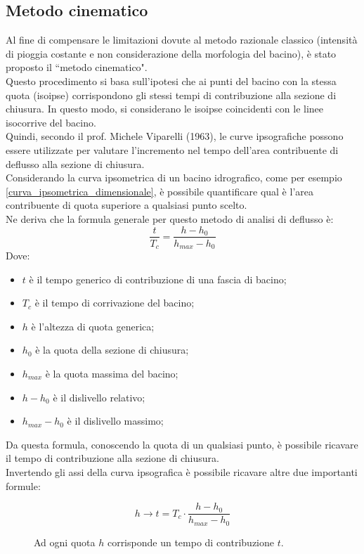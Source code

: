 \subsection{Metodo cinematico}
Al fine di compensare le limitazioni dovute al metodo razionale classico (intensità di pioggia costante e non considerazione della morfologia del bacino), è stato proposto il ``metodo cinematico".\\
Questo procedimento si basa sull'ipotesi che ai punti del bacino con la stessa quota (isoipse) corrispondono gli stessi tempi di contribuzione alla sezione di chiusura. In questo modo, si considerano le isoipse coincidenti con le linee isocorrive del bacino.\\
Quindi, secondo il prof. Michele Viparelli (1963), le curve ipsografiche possono essere utilizzate per valutare l'incremento nel tempo dell'area contribuente di deflusso alla sezione di chiusura.\\
Considerando la curva ipsometrica di un bacino idrografico, come per esempio \ref{curva_ipsometrica_dimensionale}, è possibile quantificare qual è l'area contribuente di quota superiore a qualsiasi punto scelto.\\
Ne deriva che la formula generale per questo metodo di analisi di deflusso è:
\begin{equation}
    \frac{t}{T_c} = \frac{h - h_0}{h_{max} - h_0}
    \label{formula_generica_metodo_cinematico}
\end{equation}
Dove:
\begin{itemize}
    \item $t$ è il tempo generico di contribuzione di una fascia di bacino;
    \item $T_c$ è il tempo di corrivazione del bacino;
    \item $h$ è l'altezza di quota generica;
    \item $h_0$ è la quota della sezione di chiusura;
    \item $h_{max}$ è la quota massima del bacino;
    \item $h - h_0$ è il dislivello relativo;
    \item $h_{max}-h_0$ è il dislivello massimo;
\end{itemize}
Da questa formula, conoscendo la quota di un qualsiasi punto, è possibile ricavare il tempo di contribuzione alla sezione di chiusura.\\
Invertendo gli assi della curva ipsografica è possibile ricavare altre due importanti formule:

\begin{figure}[H]
\begin{equation}
    h \rightarrow t= T_c \cdot \frac{h - h_0}{h_{max} - h_0}
    \label{eq:h_tcontribuzione}
\end{equation}
\caption*{Ad ogni quota $h$ corrisponde un tempo di contribuzione $t$.}
\end{figure}

